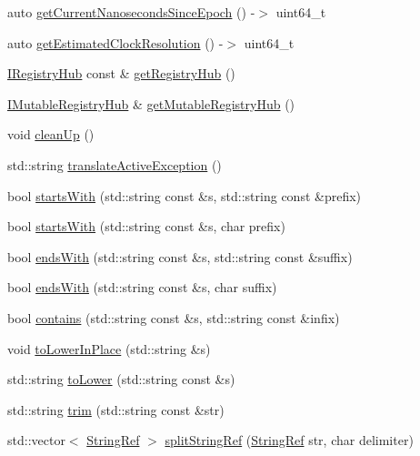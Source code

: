 \begin{DoxyCompactItemize}
\item 
auto \mbox{\hyperlink{namespace_catch_a98d058468488c486a9cb5c8463f3ba29}{get\+Current\+Nanoseconds\+Since\+Epoch}} () -\/$>$ uint64\+\_\+t
\item 
auto \mbox{\hyperlink{namespace_catch_ac8e1ed37624bd0d97b2c0d4ec099d31f}{get\+Estimated\+Clock\+Resolution}} () -\/$>$ uint64\+\_\+t
\item 
\mbox{\hyperlink{struct_catch_1_1_i_registry_hub}{I\+Registry\+Hub}} const  \& \mbox{\hyperlink{namespace_catch_a6332c92ab0c3952586b22cb96fdb8d44}{get\+Registry\+Hub}} ()
\item 
\mbox{\hyperlink{struct_catch_1_1_i_mutable_registry_hub}{I\+Mutable\+Registry\+Hub}} \& \mbox{\hyperlink{namespace_catch_ac9ddcc6d66079add9cb2a3140b8ae51e}{get\+Mutable\+Registry\+Hub}} ()
\item 
void \mbox{\hyperlink{namespace_catch_a0f78e9afdebc6d4512d18e76fbf54b8c}{clean\+Up}} ()
\item 
std\+::string \mbox{\hyperlink{namespace_catch_adafff91485eeeeb9e9333f317cc0e3b1}{translate\+Active\+Exception}} ()
\item 
bool \mbox{\hyperlink{namespace_catch_a695f62327be0676e046291eeaae15110}{starts\+With}} (std\+::string const \&s, std\+::string const \&prefix)
\item 
bool \mbox{\hyperlink{namespace_catch_acad23751846ac23d0f379e34f5adebb1}{starts\+With}} (std\+::string const \&s, char prefix)
\item 
bool \mbox{\hyperlink{namespace_catch_ada025504f627feaf9ac68ca391515dff}{ends\+With}} (std\+::string const \&s, std\+::string const \&suffix)
\item 
bool \mbox{\hyperlink{namespace_catch_afd801a3e33fd7a8b91ded0d02747a93f}{ends\+With}} (std\+::string const \&s, char suffix)
\item 
bool \mbox{\hyperlink{namespace_catch_aa52974b0e426e7e2fbd725a900e9c36e}{contains}} (std\+::string const \&s, std\+::string const \&infix)
\item 
void \mbox{\hyperlink{namespace_catch_a0760dbe87d090a55a35414db57d272c4}{to\+Lower\+In\+Place}} (std\+::string \&s)
\item 
std\+::string \mbox{\hyperlink{namespace_catch_ac036a17412d318598ffda8e1fe7a1177}{to\+Lower}} (std\+::string const \&s)
\item 
std\+::string \mbox{\hyperlink{namespace_catch_a084108b47f37d8bfd5db51c50c7451b3}{trim}} (std\+::string const \&str)
\item 
std\+::vector$<$ \mbox{\hyperlink{class_catch_1_1_string_ref}{String\+Ref}} $>$ \mbox{\hyperlink{namespace_catch_a35ef4c6329ab86a47243c25a58274109}{split\+String\+Ref}} (\mbox{\hyperlink{class_catch_1_1_string_ref}{String\+Ref}} str, char delimiter)

\end{DoxyCompactItemize}

